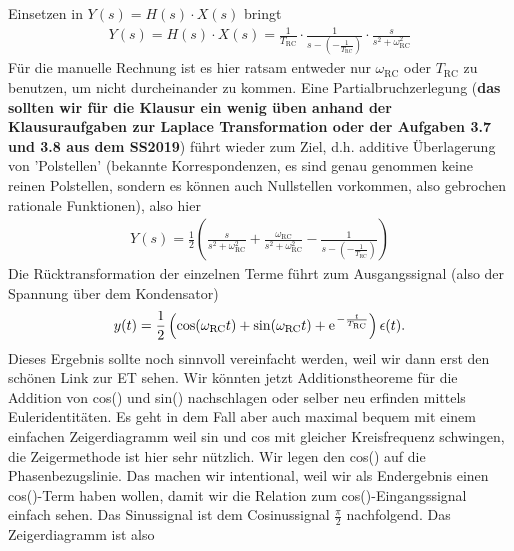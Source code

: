 \documentclass[11pt,a4paper,DIV=12]{scrartcl}
\numberwithin{equation}{section}
\numberwithin{figure}{section}
\begin{document}
\begin{Loesung}
\begin{itemize}
Einsetzen in $Y(s) = H(s)\cdot X(s)$ bringt
%
\begin{align}
Y(s) = H(s) \cdot X(s) = \frac{1}{T_\mathrm{RC}} \cdot \frac{1}{s - (-\frac{1}{T_\mathrm{RC}})} \cdot \frac{s}{s^2+\omega_\mathrm{RC}^2}
\end{align}
Für die manuelle Rechnung ist es hier ratsam entweder nur $\omega_\mathrm{RC}$ oder
$T_\mathrm{RC}$ zu benutzen, um nicht durcheinander zu kommen.
%
Eine Partialbruchzerlegung (\textbf{das sollten wir für die Klausur ein wenig üben
anhand der Klausuraufgaben zur Laplace Transformation oder der Aufgaben 3.7 und 3.8
aus dem SS2019})
 führt wieder zum Ziel, d.h. additive Überlagerung von
'Polstellen' (bekannte Korrespondenzen, es sind genau genommen keine reinen Polstellen,
sondern es können auch Nullstellen vorkommen, also gebrochen rationale Funktionen),
also hier
\begin{align}
Y(s) = \frac{1}{2} \left(
\frac{s}{s^2+\omega_\mathrm{RC}^2} + \frac{\omega_\mathrm{RC}}{s^2+\omega_\mathrm{RC}^2} - \frac{1}{s-(-\frac{1}{T_\mathrm{RC}})}
\right)
\end{align}
%
Die Rücktransformation der einzelnen Terme führt zum Ausgangssignal (also der
Spannung über dem Kondensator)
\begin{align}
  y(t) = \frac{1}{2}\left(
  \cos(\omega_\mathrm{RC} t) + \sin(\omega_\mathrm{RC} t) + \e^{-\frac{t}{T_\mathrm{RC}}}
  \right) \epsilon(t).
\end{align}
Dieses Ergebnis sollte noch sinnvoll vereinfacht werden, weil wir dann erst
den schönen Link zur ET sehen.
%
Wir könnten jetzt Additionstheoreme für die Addition von cos() und sin() nachschlagen
oder selber neu erfinden mittels Euleridentitäten.
%
Es geht in dem Fall aber auch maximal bequem mit einem einfachen Zeigerdiagramm
weil sin und cos mit gleicher Kreisfrequenz schwingen, die Zeigermethode ist hier
sehr nützlich. Wir legen den cos() auf die Phasenbezugslinie.
Das machen wir intentional, weil wir als Endergebnis
einen cos()-Term haben wollen, damit wir die Relation zum cos()-Eingangssignal
einfach sehen. Das Sinussignal ist dem Cosinussignal $\frac{\pi}{2}$ nachfolgend.
Das Zeigerdiagramm ist also
\begin{center}
\end{center}
\end{itemize}
\end{Loesung}
\end{document}
